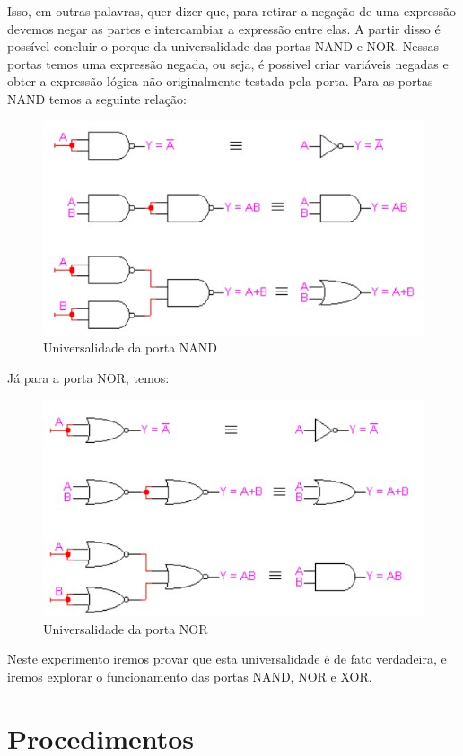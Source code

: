 \documentclass[12pt]{article}
\begin{document}
	Isso, em outras palavras, quer dizer que, para retirar a negação de uma expressão devemos negar as partes e intercambiar a expressão entre elas. A partir disso é possível concluir o porque da universalidade das portas NAND e NOR. Nessas portas temos uma expressão negada, ou seja, é possivel criar variáveis negadas e obter a expressão lógica não originalmente testada pela porta. Para as portas NAND temos a seguinte relação:
	
	\begin{figure}[H]
		\centering
		\includegraphics[width=.5\textwidth]{portanand.jpg}
		\caption{Universalidade da porta NAND}
		\label{fig:exemplo}
	\end{figure}
	
	Já para a porta NOR, temos:
	
	\begin{figure}[H]
		\centering
		\includegraphics[width=.5\textwidth]{portanor.jpg}
		\caption{Universalidade da porta NOR}
		\label{fig:exemplo}
	\end{figure}
	
	Neste experimento iremos provar que esta universalidade é de fato verdadeira, e iremos explorar o funcionamento das portas NAND, NOR e XOR.
	
	
	\section{Procedimentos}
	\label{sec:Procedimentos}
	
\end{document}
